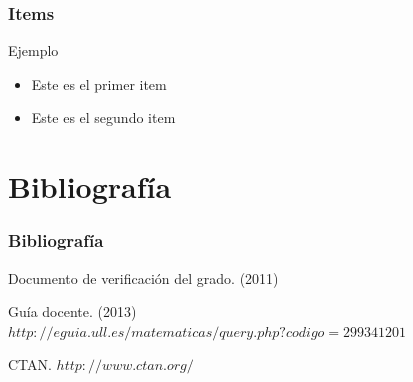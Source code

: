 \documentclass{beamer}
\begin{document}
\begin{frame}

\frametitle{Items}

\begin{block}{Ejemplo}
  \begin{itemize}
  \item
  Este es el primer item
  \pause

  \item
  Este es el segundo item

  \end{itemize}
\end{block}

\end{frame}



\section{Bibliografía}
\begin{frame}
  \frametitle{Bibliografía}

  \begin{thebibliography}{10}

    \beamertemplatebookbibitems
    Documento de verificación del grado.
    (2011)

    \beamertemplatebookbibitems
    Guía docente.
    (2013)
    {\small $http://eguia.ull.es/matematicas/query.php?codigo=299341201$}

    \beamertemplatebookbibitems
    CTAN. {\small $http://www.ctan.org/$}

  \end{thebibliography}
\end{frame}

\end{document}
